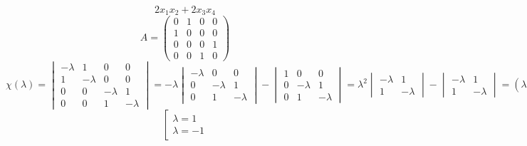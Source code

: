 $$ 2x_1x_2 + 2x_3x_4 $$
$$ A =
\begin{pmatrix}
	0 & 1 & 0 & 0 \\
    1 & 0 & 0 & 0 \\
    0 & 0 & 0 & 1 \\
    0 & 0 & 1 & 0
\end{pmatrix} $$
$$ \chi(\lambda) =
\begin{vmatrix}
	-\lambda & 1 & 0 & 0 \\
    1 & -\lambda & 0 & 0 \\
    0 & 0 & -\lambda & 1 \\
    0 & 0 & 1 & -\lambda
\end{vmatrix} = -\lambda
\begin{vmatrix}
	-\lambda & 0 & 0 \\
    0 & -\lambda & 1 \\
    0 & 1 & -\lambda
\end{vmatrix} -
\begin{vmatrix}
	1 & 0 & 0 \\
    0 & -\lambda & 1 \\
    0 & 1 & -\lambda
\end{vmatrix} = \lambda^2
\begin{vmatrix}
	-\lambda & 1 \\
    1 & -\lambda
\end{vmatrix} -
\begin{vmatrix}
	-\lambda & 1 \\
    1 & -\lambda
\end{vmatrix} = (\lambda^2 - 1)^2 $$
$$ \left[
\begin{aligned}
	\lambda = 1 \\
    \lambda = -1
\end{aligned} \right. $$
